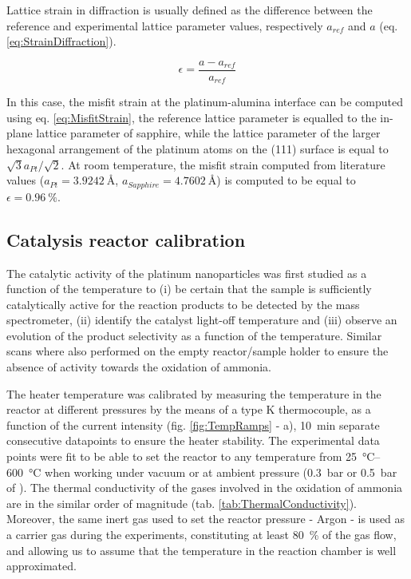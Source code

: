 Lattice strain in diffraction is usually defined as the difference between the reference and experimental lattice parameter values, respectively $a_{ref}$ and $a$ (eq. \ref{eq:StrainDiffraction}).

\begin{equation}
    \epsilon = \frac{a - a_{ref}}{a_{ref}}
    \label{eq:StrainDiffraction}
\end{equation}

In this case, the misfit strain at the platinum-alumina interface can be computed using eq. \ref{eq:MisfitStrain}, the reference lattice parameter is equalled to the in-plane lattice parameter of sapphire, while the lattice parameter of the larger hexagonal arrangement of the platinum atoms on the (111) surface is equal to $\sqrt{3} a_{Pt} / \sqrt{2} $.
At room temperature, the misfit strain computed from literature values ($a_{Pt} = \qty{3.9242}{\angstrom}$, $a_{Sapphire} = \qty{4.7602}{\angstrom}$) is computed to be equal to $\epsilon = \qty{0.96}{\percent}$.

\subsection{Catalysis reactor calibration}

The catalytic activity of the platinum nanoparticles was first studied as a function of the temperature to (i) be certain that the sample is sufficiently catalytically active for the reaction products to be detected by the mass spectrometer, (ii) identify the catalyst light-off temperature and (iii) observe an evolution of the product selectivity as a function of the temperature.
Similar scans where also performed on the empty reactor/sample holder to ensure the absence of activity towards the oxidation of ammonia.

The heater temperature was calibrated by measuring the temperature in the reactor at different pressures by the means of a type K thermocouple, as a function of the current intensity (fig. \ref{fig:TempRamps} - a), \qty{10}{\minute} separate consecutive datapoints to ensure the heater stability.
The experimental data points were fit to be able to set the reactor to any temperature from \qtyrange{25}{600}{\degreeCelsius} when working under vacuum or at ambient pressure (\qty{0.3}{\bar} or \qty{0.5}{\bar} of ).
The thermal conductivity of the gases involved in the oxidation of ammonia are in the similar order of magnitude (tab. \ref{tab:ThermalConductivity}).
Moreover, the same inert gas used to set the reactor pressure - Argon - is used as a carrier gas during the experiments, constituting at least \qty{80}{\percent} of the gas flow, and allowing us to assume that the temperature in the reaction chamber is well approximated.

